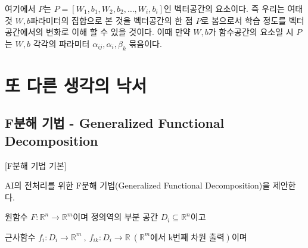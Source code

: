 \documentclass{book}
\begin{document}
여기에서 $P$는 $P=[W_1,b_1,W_2,b_2,\ldots,W_i,b_i]$인 벡터공간의 요소이다. 즉 우리는 여태 것 $W,b$파라미터의 집합으로 본 것을 벡터공간의 한 점 $P$로 봄으로서 학습 정도를 벡터 공간에서의 변화로 이해 할 수 있을 것이다. 이때 만약 $W,b$가 함수공간의 요소일 시 $P$는 $W,b$ 각각의 파라미터 $\alpha_{ij}, \alpha_{i}, \beta_k$ 묶음이다.

\part{또 다른 생각의 낙서}

\chapter{F분해 기법 - Generalized Functional Decomposition}
[F분해 기법 기본]

AI의 전처리를 위한 F분해 기법(Generalized Functional Decomposition)을 제안한다.

원함수 $F:\mathbb{R}^n \rightarrow \mathbb{R}^m$이며 정의역의 부분 공간 $D_i \subseteq \mathbb{R}^n$이고

근사함수 $f_i:D_i \rightarrow \mathbb{R}^m~,~f_{ik}:D_i \rightarrow \mathbb{R}~(\mathbb{R}^m\text{에서 k번째 차원 출력})$이며
\end{document}
